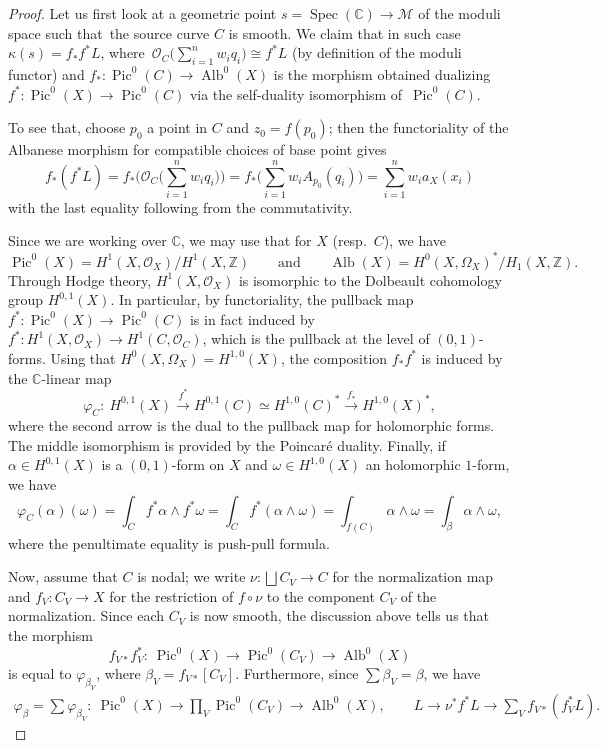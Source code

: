\documentclass[11pt]{article}
\numberwithin{equation}{section}
\newcommand{\Pic}{\operatorname{Pic}}
\newcommand{\Alb}{\operatorname{Alb}}
\newcommand{\ZZ}{\mathbb{Z}}
\newcommand{\CC}{\mathbb{C}}
\newcommand{\M}{\mathcal{M}}
\renewcommand{\O}{\mathcal{O}}
\numberwithin{equation}{section}
\theoremstyle{definition}
\begin{document}
\begin{proof}
Let us first look at a geometric point $s=\operatorname{Spec}(\mathbb C)\to\M$ of the moduli space such that~the source curve $C$ is smooth. We claim that in such case
$\kappa(s)=f_*f^*L$,
where~${\O_C \bigl(\sum_{i=1}^n w_i q_i\bigr)\cong f^*L}$ (by definition of the moduli functor) and
$f_*\colon\Pic^0(C)\to\operatorname{Alb}^0(X)$ is the morphism obtained dualizing $f^*\colon\Pic^0(X)\to\Pic^0(C)$ via the self-duality isomorphism of~$\Pic^0(C)$.

To see that, choose $p_0$ a point in $C$ and $z_0=f(p_0)$; then the functoriality of the Albanese morphism for compatible choices of base point gives
\[f_*(f^*L)=f_*\biggl(\O_C\biggl(\sum_{i=1}^n w_i q_i\biggr)\biggr)=f_*\biggl(\sum_{i=1}^n w_i A_{p_0}(q_i)\biggr)= \sum_{i=1}^n w_i a_X(x_i)\]
with the last equality following from the commutativity.

Since we are working over $\mathbb C$, we may use that for $X$ (resp.\ $C$), we have
 \[ \Pic^0(X)=H^1(X,\O_X)/H^1(X,\ZZ) \qquad \text{and}\qquad \Alb(X)=H^0(X,\Omega_X)^*/H_1(X,\ZZ). \]
Through Hodge theory, $H^1(X,\O_X)$ is isomorphic to the Dolbeault cohomology group $H^{0,1}(X)$. In particular, by functoriality, the pullback map $f^*\colon\Pic^0(X)\to\Pic^0(C)$ is in fact induced by~${f^*\colon H^1(X,\O_X)\to H^1(C,\O_C)}$, which is the pullback at the level of $(0,1)$-forms. Using that $H^0(X,\Omega_X)=H^{1,0}(X)$, the composition $f_* f^*$ is induced by the $\CC$-linear map
 \[ \varphi_C \colon\ H^{0,1}(X) \xrightarrow{f^*} H^{0,1}(C)\simeq H^{1,0}(C)^*\xrightarrow{f_*}H^{1,0}(X)^*, \]
where the second arrow is the dual to the pullback map for holomorphic forms. The middle isomorphism is provided by the Poincar\'e duality. Finally, if $\alpha\in H^{0,1}(X)$ is a $(0,1)$-form on $X$ and $\omega\in H^{1,0}(X)$ an holomorphic $1$-form, we have
 \[ \varphi_C(\alpha)(\omega) = \int_C f^*\alpha\wedge f^*\omega = \int_C f^*(\alpha\wedge\omega) = \int_{f(C)}\alpha\wedge\omega= \int_\beta \alpha\wedge\omega, \]
where the penultimate equality is push-pull formula.

Now, assume that $C$ is nodal; we write $\nu\colon\bigsqcup C_V\to C$ for the normalization map and $f_V\colon C_V\to X$ for the restriction of $f\circ\nu$ to the component $C_V$ of the normalization. Since each $C_V$ is now smooth, the discussion above tells us that the morphism
\[
f_{V\ast}f_V^*\colon\ \Pic^0(X)\to\Pic^0(C_V)\to\operatorname{Alb}^0(X)
\]
is equal to $\varphi_{\beta_V}$, where $\beta_V=f_{V\ast}[C_V]$. Furthermore, since $\sum \beta_V=\beta$, we have
\begin{align*}
\varphi_{\beta}=\sum \varphi_{\beta_V}\colon\ \Pic^0(X) \to\prod_V\Pic^0(C_V)\to\operatorname{Alb}^0(X),\qquad
 L \to \nu^*f^*L\to \sum_V f_{V\ast}(f_V^*L).
\end{align*}


\end{proof}
\end{document}
